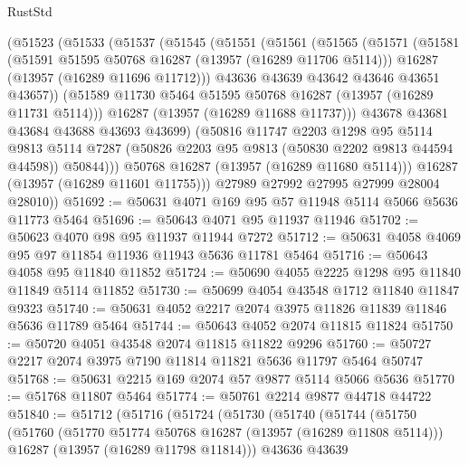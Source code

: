\begin{lexlean}{RustStd}
\begin{coremodule}
        (@51523
          (@51533
            (@51537
              (@51545
                (@51551
                  (@51561
                    (@51565
                      (@51571
                        (@51581
                          (@51591 @51595 @50768 @16287 (@13957 (@16289 @11706 @5114)))
                          @16287
                          (@13957 (@16289 @11696 @11712)))
                        @43636
                        @43639
                        @43642
                        @43646
                        @43651
                        @43657))
                    (@51589 @11730 @5464 @51595 @50768 @16287 (@13957 (@16289 @11731 @5114)))
                    @16287
                    (@13957 (@16289 @11688 @11737)))
                  @43678
                  @43681
                  @43684
                  @43688
                  @43693
                  @43699)
                (@50816
                  @11747
                  @2203
                  @1298
                  @95
                  @5114
                  @9813
                  @5114
                  @7287
                  (@50826 @2203 @95 @9813 (@50830 @2202 @9813 @44594 @44598))
                  @50844)))
            @50768
            @16287
            (@13957 (@16289 @11680 @5114)))
          @16287
          (@13957 (@16289 @11601 @11755)))
        @27989
        @27992
        @27995
        @27999
        @28004
        @28010))
@51692 := @50631 @4071 @169 @95 @57 @11948 @5114 @5066 @5636 @11773 @5464
@51696 := @50643 @4071 @95 @11937 @11946
@51702 := @50623 @4070 @98 @95 @11937 @11944 @7272
@51712 := @50631 @4058 @4069 @95 @97 @11854 @11936 @11943 @5636 @11781 @5464
@51716 := @50643 @4058 @95 @11840 @11852
@51724 := @50690 @4055 @2225 @1298 @95 @11840 @11849 @5114 @11852
@51730 := @50699 @4054 @43548 @1712 @11840 @11847 @9323
@51740 := @50631 @4052 @2217 @2074 @3975 @11826 @11839 @11846 @5636 @11789 @5464
@51744 := @50643 @4052 @2074 @11815 @11824
@51750 := @50720 @4051 @43548 @2074 @11815 @11822 @9296
@51760 := @50727 @2217 @2074 @3975 @7190 @11814 @11821 @5636 @11797 @5464 @50747
@51768 := @50631 @2215 @169 @2074 @57 @9877 @5114 @5066 @5636
@51770 := @51768 @11807 @5464
@51774 := @50761 @2214 @9877 @44718 @44722
@51840 := @51712
    (@51716
      (@51724
        (@51730
          (@51740
            (@51744
              (@51750
                (@51760
                  (@51770 @51774 @50768 @16287 (@13957 (@16289 @11808 @5114)))
                  @16287
                  (@13957 (@16289 @11798 @11814)))
                @43636
                @43639

\end{coremodule}
\end{lexlean}
